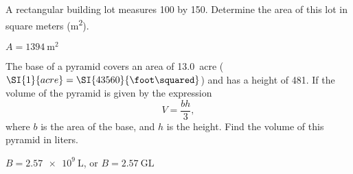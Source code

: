 \begin{question}[ID=UC05,topic=unit-conversion,difficulty=easy]
    A rectangular building lot measures \SI{100}{\foot} by \SI{150}{\foot}.
    Determine the area of this lot in square meters (\si{\meter\squared}).
\end{question}
\begin{solution}
    $A = \SI{1394}{\meter\squared}$
\end{solution}

\begin{question}[ID=UC05,topic=unit-conversion,difficulty=easy]
    The base of a pyramid covers an area of \SI{13.0}{acre}
    ($\SI{1}{acre}=\SI{43560}{\foot\squared}$)
        and has a height of \SI{481}{\foot}.
    If the volume of the pyramid is given by the expression
    \begin{equation*}
        V = \frac{bh}{3},
    \end{equation*}
    where $b$ is the area of the base, and $h$ is the height.
    Find the volume of this pyramid in liters.
\end{question}
\begin{solution}
    $B = \SI{2.57e9}{\liter}$, or $B = \SI{2.57}{\giga\liter}$
\end{solution}

